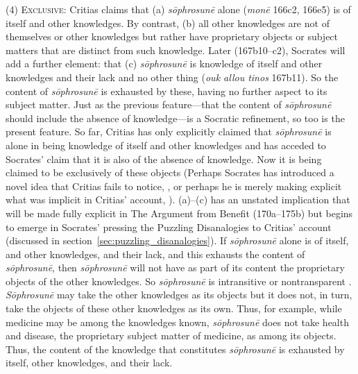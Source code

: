 (4) \textsc{Exclusive}: Critias claims that (a) \emph{sōphrosunē} alone (\emph{monē} 166c2, 166e5) is of itself and other knowledges. By contrast, (b) all other knowledges are not of themselves or other knowledges but rather have proprietary objects or subject matters that are distinct from such knowledge. Later (167b10–c2), Socrates will add a further element: that (c) \emph{sōphrosunē} is knowledge of itself and other knowledges and their lack and no other thing (\emph{ouk allou tinos} 167b11). So the content of \emph{sōphrosunē} is exhausted by these, having no further aspect to its subject matter. Just as the previous feature—that the content of \emph{sōphrosunē} should include the absence of knowledge—is a Socratic refinement, so too is the present feature. So far, Critias has only explicitly claimed that \emph{sōphrosunē} is alone in being knowledge of itself and other knowledges and has acceded to Socrates' claim that it is also of the absence of knowledge. Now it is being claimed to be exclusively of these objects (Perhaps Socrates has introduced a novel idea that Critias fails to notice, \citealt[37–8]{Duncombe:2020gi}, or perhaps he is merely making explicit what was implicit in Critias' account, \citealt[]{Tsouna:2022aa}). (a)–(c) has an unstated implication that will be made fully explicit in The Argument from Benefit (170a–175b) but begins to emerge in Socrates' pressing the Puzzling Disanalogies to Critias' account (discussed in section~\ref{sec:puzzling_disanalogies}). If \emph{sōphrosunē} alone is of itself, and other knowledges, and their lack, and this exhausts the content of \emph{sōphrosunē}, then \emph{sōphrosunē} will not have as part of its content the proprietary objects of the other knowledges. So \emph{sōphrosunē} is intransitive \citep{McCabe:2007ss} or nontransparent \citep[190]{Tsouna:2022aa}. \emph{Sōphrosunē} may take the other knowledges as its objects but it does not, in turn, take the objects of these other knowledges as its own. Thus, for example, while medicine may be among the knowledges known, \emph{sōphrosunē} does not take health and disease, the proprietary subject matter of medicine, as among its objects. Thus, the content of the knowledge that constitutes \emph{sōphrosunē} is exhausted by itself, other knowledges, and their lack.

